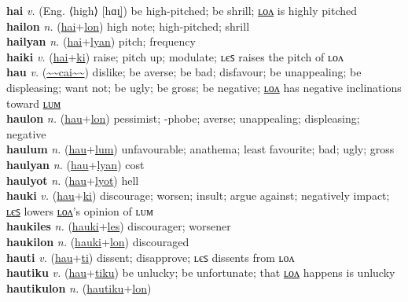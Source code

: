 \textbf{hai} \textit{v.} (Eng. ⟨high⟩ [hɑɪ̯])
be high-pitched; be shrill; \hyperref[hailon]{ʟᴏᴧ} is highly pitched \label{hai} \\
\textbf{hailon} \textit{n.} (\hyperref[hai]{hai}+\hyperref[lon]{lon})
high note; high-pitched; shrill \label{hailon} \\
\textbf{hailyan} \textit{n.} (\hyperref[hai]{hai}+\hyperref[lyan]{lyan})
pitch; frequency \label{hailyan} \\
\textbf{haiki} \textit{v.} (\hyperref[hai]{hai}+\hyperref[ki]{ki})
raise; pitch up; modulate; ʟєꜱ raises the pitch of ʟᴏᴧ \label{haiki} \\
\textbf{hau} \textit{v.} (\hyperref[cai]{\~{}\~{}cai\~{}\~{}})
dislike; be averse; be bad; disfavour; be unappealing; be displeasing; want not; be ugly; be gross; be negative; \hyperref[haulon]{ʟᴏᴧ} has negative inclinations toward \hyperref[haulum]{ʟᴜᴍ} \label{hau} \\
\textbf{haulon} \textit{n.} (\hyperref[hau]{hau}+\hyperref[lon]{lon})
pessimist; -phobe; averse; unappealing; displeasing; negative \label{haulon} \\
\textbf{haulum} \textit{n.} (\hyperref[hau]{hau}+\hyperref[lum]{lum})
unfavourable; anathema; least favourite; bad; ugly; gross \label{haulum} \\
\textbf{haulyan} \textit{n.} (\hyperref[hau]{hau}+\hyperref[lyan]{lyan})
cost \label{haulyan} \\
\textbf{haulyot} \textit{n.} (\hyperref[hau]{hau}+\hyperref[lyot]{lyot})
hell \label{haulyot} \\
\textbf{hauki} \textit{v.} (\hyperref[hau]{hau}+\hyperref[ki]{ki})
discourage; worsen; insult; argue against; negatively impact; \hyperref[haukiles]{ʟєꜱ} lowers \hyperref[haukilon]{ʟᴏᴧ}'s opinion of ʟᴜᴍ \label{hauki} \\
\textbf{haukiles} \textit{n.} (\hyperref[hauki]{hauki}+\hyperref[les]{les})
discourager; worsener \label{haukiles} \\
\textbf{haukilon} \textit{n.} (\hyperref[hauki]{hauki}+\hyperref[lon]{lon})
discouraged \label{haukilon} \\
\textbf{hauti} \textit{v.} (\hyperref[hau]{hau}+\hyperref[ti]{ti})
dissent; disapprove; ʟєꜱ dissents from ʟᴏᴧ \label{hauti} \\
\textbf{hautiku} \textit{v.} (\hyperref[hau]{hau}+\hyperref[tiku]{tiku})
be unlucky; be unfortunate; that \hyperref[hautikulon]{ʟᴏᴧ} happens is unlucky \label{hautiku} \\
\textbf{hautikulon} \textit{n.} (\hyperref[hautiku]{hautiku}+\hyperref[lon]{lon})
